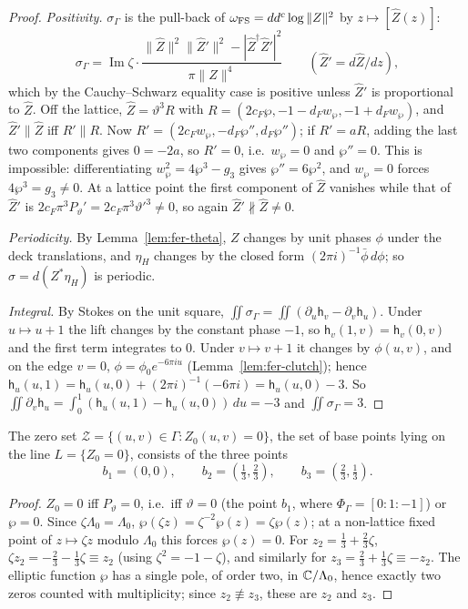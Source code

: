\begin{proof}
\emph{Positivity.} $\sigma_\Gamma$ is the pull-back of $\omega_{\rm FS}=dd^c\log\|Z\|^2$ by $z\mapsto[\hat Z(z)]$:
\[
 \sigma_\Gamma=\operatorname{Im}\zeta\cdot\frac{\|\hat Z\|^2\|\hat Z'\|^2-|\hat Z^\dagger \hat Z'|^2}{\pi\|\hat Z\|^4}
 \qquad(\hat Z'=d\hat Z/dz),
\]
which by the Cauchy--Schwarz equality case is positive unless $\hat Z'$ is proportional to $\hat Z$. Off the lattice,
$\hat Z=\vartheta^3R$ with $R=(2c_F\wp,-1-d_Fw_\wp,-1+d_Fw_\wp)$, and $\hat Z'\parallel \hat Z$ iff $R'\parallel R$. Now
$R'=(2c_Fw_\wp,-d_F\wp'',d_F\wp'')$; if $R'=aR$, adding the last two components gives $0=-2a$, so $R'=0$, i.e.\ $w_\wp=0$ and
$\wp''=0$. This is impossible: differentiating $w_\wp^2=4\wp^3-g_3$ gives $\wp''=6\wp^2$, and $w_\wp=0$ forces $4\wp^3=g_3\ne0$.
At a lattice point the first component of $\hat Z$ vanishes while that of $\hat Z'$ is
$2c_F\pi^3P_\vartheta'=2c_F\pi^3\vartheta'^3\ne0$, so again $\hat Z'\not\parallel \hat Z\ne0$.

\emph{Periodicity.} By Lemma~\ref{lem:fer-theta}, $Z$ changes by unit phases $\phi$ under the deck translations, and
$\eta_H$ changes by the closed form $(2\pi i)^{-1}\bar\phi\,d\phi$; so $\sigma=d(Z^*\eta_H)$ is periodic.

\emph{Integral.} By Stokes on the unit square, $\iint\sigma_\Gamma=\iint(\partial_u\mathsf h_v-\partial_v\mathsf h_u)$. Under $u\mapsto u+1$
the lift changes by the constant phase $-1$, so $\mathsf h_v(1,v)=\mathsf h_v(0,v)$ and the first term integrates to $0$. Under
$v\mapsto v+1$ it changes by $\phi(u,v)$, and on the edge $v=0$, $\phi=\phi_0e^{-6\pi iu}$ (Lemma~\ref{lem:fer-clutch}); hence
$\mathsf h_u(u,1)=\mathsf h_u(u,0)+(2\pi i)^{-1}(-6\pi i)=\mathsf h_u(u,0)-3$. So
$\iint\partial_v\mathsf h_u=\int_0^1(\mathsf h_u(u,1)-\mathsf h_u(u,0))\,du=-3$ and $\iint\sigma_\Gamma=3$.
\end{proof}

\begin{lemma}\label{lem:fer-bpoints}
The zero set $\mathcal Z=\{(u,v)\in\Gamma:Z_0(u,v)=0\}$, the set of base points lying on the line $L=\{Z_0=0\}$,
consists of the three points
\[
 b_1=(0,0),\qquad b_2=(\tfrac13,\tfrac23),\qquad b_3=(\tfrac23,\tfrac13).
\]
\end{lemma}

\begin{proof}
$Z_0=0$ iff $P_\vartheta=0$, i.e.\ iff $\vartheta=0$ (the point $b_1$, where $\Phi_\Gamma=[0:1:-1]$) or $\wp=0$. Since $\zeta\Lambda_0=\Lambda_0$,
$\wp(\zeta z)=\zeta^{-2}\wp(z)=\zeta\wp(z)$; at a non-lattice fixed point of $z\mapsto\zeta z$ modulo $\Lambda_0$ this forces
$\wp(z)=0$. For $z_2=\frac13+\frac23\zeta$, $\zeta z_2=-\frac23-\frac13\zeta\equiv z_2$ (using $\zeta^2=-1-\zeta$), and similarly for
$z_3=\frac23+\frac13\zeta\equiv-z_2$. The elliptic function $\wp$ has a single pole, of order two, in $\mathbb{C}/\Lambda_0$,
hence exactly two zeros counted with multiplicity; since $z_2\not\equiv z_3$, these are $z_2$ and $z_3$.
\end{proof}

